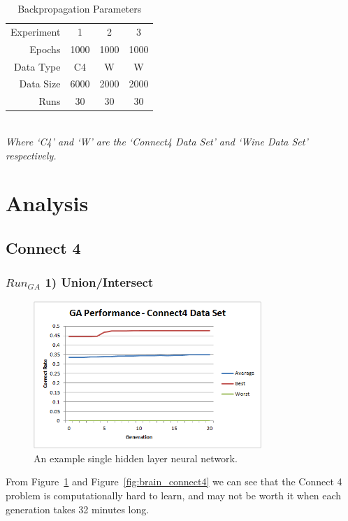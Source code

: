 \documentclass[journal]{IEEEtran}
\begin{document}
  \begin{table}[here]
    \renewcommand{\arraystretch}{1.3}
    \caption{Backpropagation Parameters}
    \label{E2}
    \centering
    \begin{tabular}{r|ccc}
  Experiment      & 1     & 2     & 3     \\
  Epochs          & 1000  & 1000  & 1000  \\
  Data Type       & C4    & W     & W     \\
  Data Size       & 6000  & 2000  & 2000  \\
  Runs            & 30    & 30    & 30    \\
    \end{tabular} \\
  \textit{Where `C4' and `W' are the `Connect4 Data Set' and `Wine Data Set' respectively.}
   \end{table}

\section{Analysis}
  \subsection{Connect 4}
    \subsubsection*{$Run_{GA}$ 1) Union/Intersect}
      \begin{figure}[here]%
        \centering
        \includegraphics[width=3.4in]{connect4_performance_new}
        \caption{An example single hidden layer neural network.}
        \label{fig:connect4_performance_new}
      \end{figure}
      From Figure~\ref{fig:connect4_performance_new} and Figure~\ref{fig:brain_connect4}
    we can see that the Connect 4 problem is computationally hard to learn, and may not
    be worth it when each generation takes 32 minutes long.
\end{document}
